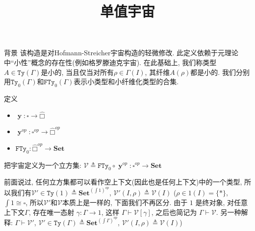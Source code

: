 \documentclass[aspectratio=169,xcolor=dvipsnames]{beamer}
\title{单值宇宙}
\date{}
\newcommand\calV{\mathcal{V}}
\newcommand\FTy{\mathtt{FTy}}
\newcommand\Ty{\mathtt{Ty}}
\newcommand\Set{\mathbf{Set}}
\DeclareMathOperator\y{\mathbf{y}}
\newcommand\cubicalsets{\widehat{□}}
\begin{document}
\begin{frame}
    \titlepage
\end{frame}

\begin{frame}{背景}
该构造是对Hofmann-Streicher宇宙构造的轻微修改. 此定义依赖于元理论中“小性”概念的存在性(例如格罗滕迪克宇宙). 在此基础上, 我们称类型$A\in\Ty(\Gamma)$是小的, 当且仅当对所有$ρ∈Γ(I)$, 其纤维$A(ρ)$都是小的. 我们分别用$\Ty_{0}(\Gamma)$和$\FTy_{0}(\Gamma)$表示小类型和小纤维化类型的合集. 
\end{frame}

\begin{frame}[shrink]{定义}
  \begin{itemize}
    \item $\y:\square\to\cubicalsets$
    \item $\y^{op}:\square^{op}\to\cubicalsets^{op}$
    \item $\FTy_{0}:\cubicalsets^{op}\to\Set$
  \end{itemize}

  把宇宙定义为一个立方集: $\calV \triangleq \FTy_{0}\circ\y^{op} : \square^{op} \to \Set$

  前面说过, 任何立方集都可以看作空上下文(因此也是任何上下文)中的一个类型, 所以我们有$\calV'\in\Ty(1)\triangleq\Set^{(\int1)^{op}}$, $\calV'(I,\rho)\triangleq\calV(I)$ ($\rho\in1(I)=\{\ast\}$, $\int1\cong\square$, 所以$\calV'$和$\calV$本质上是一样的, 下面我们不再区分. 由于 $1$ 是终对象, 对任意上下文$\Gamma$, 存在唯一态射 $\gamma:\Gamma\to1$, 这样 $\Gamma\vdash \calV[\gamma]$, 之后也简记为 $\Gamma\vdash\calV$. 另一种解释: $\Gamma\vdash\calV'$, $\calV'\in\Ty(\Gamma)\triangleq\Set^{(\int\Gamma)^{op}}$, $\calV'(I,\rho)\triangleq\calV(I)$)
\end{frame}
\end{document}
